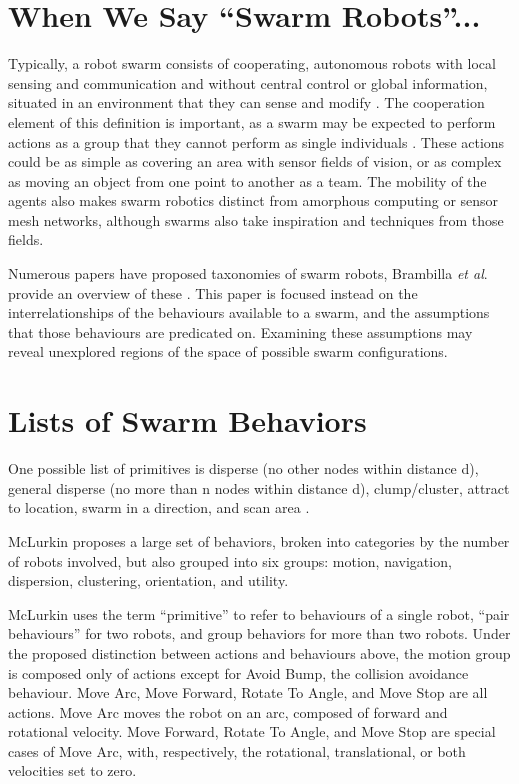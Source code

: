 \documentclass[]{article}
\begin{document}
\section{When We Say ``Swarm Robots''...}

Typically, a robot swarm consists of cooperating, autonomous robots with local sensing and communication and without central control or global information, situated in an environment that they can sense and modify \cite{brambilla2013swarm}.
The cooperation element of this definition is important, as a swarm may be expected to perform actions as a group that they cannot perform as single individuals \cite{csahin2004swarm}. 
These actions could be as simple as covering an area with sensor fields of vision, or as complex as moving an object from one point to another as a team. 
The mobility of the agents also makes swarm robotics distinct from amorphous computing or sensor mesh networks, although swarms also take inspiration and techniques from those fields.  

Numerous papers have proposed taxonomies of swarm robots, Brambilla \textit{et al}. provide an overview of these \cite{brambilla2013swarm}. 
This paper is focused instead on the interrelationships of the behaviours available to a swarm, and the assumptions that those behaviours are predicated on. 
Examining these assumptions may reveal unexplored regions of the space of possible swarm configurations. 


\section{Lists of Swarm Behaviors}

One possible list of primitives is disperse (no other nodes within distance d), general disperse (no more than n nodes within distance d), clump/cluster, attract to location, swarm in a direction, and scan area \cite{evans2000programming}.

McLurkin proposes a large set of behaviors, broken into categories by the number of robots involved, but also grouped into six groups: motion, navigation, dispersion, clustering, orientation, and utility.

McLurkin uses the term ``primitive'' to refer to behaviours of a single robot, ``pair behaviours'' for two robots, and group behaviors for more than two robots. 
Under the proposed distinction between actions and behaviours above, the motion group is composed only of actions except for Avoid Bump, the collision avoidance behaviour. Move Arc, Move Forward, Rotate To Angle, and Move Stop are all actions. 
Move Arc moves the robot on an arc, composed of forward and rotational velocity. Move Forward, Rotate To Angle, and Move Stop are special cases of Move Arc, with, respectively, the rotational, translational, or both velocities set to zero. 
 
\end{document}
